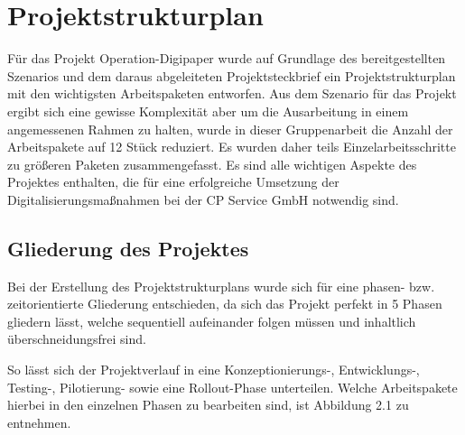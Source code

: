 \chapter{Projektstrukturplan}
\label{chapter:2}


Für das Projekt Operation-Digipaper wurde auf Grundlage des bereitgestellten Szenarios und dem daraus abgeleiteten Projektsteckbrief ein Projektstrukturplan mit den wichtigsten Arbeitspaketen entworfen. Aus dem Szenario für das Projekt ergibt sich eine gewisse Komplexität aber um die Ausarbeitung in einem angemessenen Rahmen zu halten, wurde in dieser Gruppenarbeit die Anzahl der Arbeitspakete auf 12 Stück reduziert. Es wurden daher teils Einzelarbeitsschritte zu größeren Paketen zusammengefasst. Es sind alle wichtigen Aspekte des Projektes enthalten, die für eine erfolgreiche Umsetzung der Digitalisierungsmaßnahmen bei der CP Service GmbH notwendig sind. 


\section{Gliederung des Projektes}

Bei der Erstellung des Projektstrukturplans wurde sich für eine phasen- bzw. zeitorientierte Gliederung entschieden, da sich das Projekt perfekt in 5 Phasen gliedern lässt, welche sequentiell aufeinander folgen müssen und inhaltlich überschneidungsfrei sind. 


So lässt sich der Projektverlauf in eine Konzeptionierungs-, Entwicklungs-, Testing-, Pilotierung- sowie eine Rollout-Phase unterteilen. Welche Arbeitspakete hierbei in den einzelnen Phasen zu bearbeiten sind, ist Abbildung 2.1 zu entnehmen.


